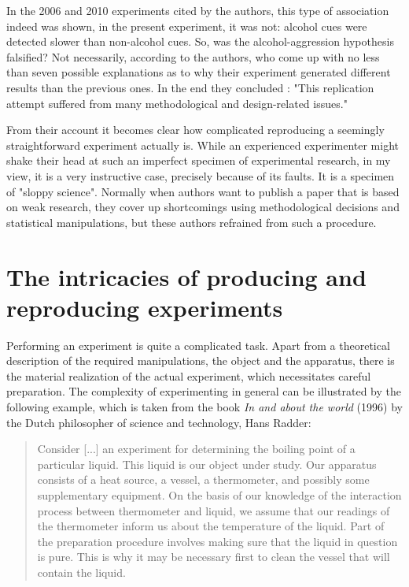 \documentclass[twocolumn, serif, authordate, reflection]{jote-article}
\begin{document}
In the 2006 and 2010 experiments cited by the authors, this type of association indeed was shown, in the present experiment, it was not: alcohol cues were detected slower than non-alcohol cues. So, was the alcohol-aggression hypothesis falsified? Not necessarily, according to the authors, who come up with no less than seven possible explanations as to why their experiment generated different results than the previous ones. In the end they concluded \parencite[p. 16]{Leboeuf2020}: "This replication attempt suffered from many methodological and design-related issues." 
 
From their account it becomes clear how complicated reproducing a seemingly straightforward experiment actually is. While an experienced experimenter might shake their head at such an imperfect specimen of experimental research, in my view, it is a very instructive case, precisely because of its faults. It is a specimen of "sloppy science". Normally when authors want to publish a paper that is based on weak research, they cover up shortcomings using methodological decisions and statistical manipulations, but these authors refrained from such a procedure.


{}
\section*{The intricacies of producing and reproducing experiments}



Performing an experiment is quite a complicated task. Apart from a theoretical description of the required manipulations, the object and the apparatus, there is the material realization of the actual experiment, which necessitates careful preparation. The complexity of experimenting in general can be illustrated by the following example, which is taken from the book \textit{In and about the world} (1996) by the Dutch philosopher of science and technology, Hans Radder:


\blockquote{Consider [...] an experiment for determining the boiling point of a particular liquid. This liquid is our object under study. Our apparatus consists of a heat source, a vessel, a thermometer, and possibly some supplementary equipment. On the basis of our knowledge of the interaction process between thermometer and liquid, we assume that our readings of the thermometer inform us about the temperature of the liquid. Part of the preparation procedure involves making sure that the liquid in question is pure. This is why it may be necessary first to clean the vessel that will contain the liquid. \parencite[p. 11]{Radder1996}}
\end{document}
